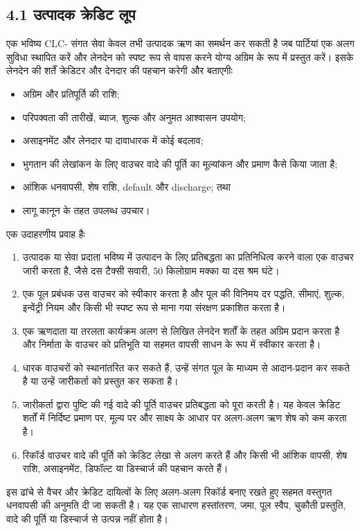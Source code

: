 \documentclass[11pt]{article}
\begin{document}
\subsection*{4.1 उत्पादक क्रेडिट लूप}

एक भविष्य CLC- संगत सेवा केवल तभी उत्पादक ऋण का समर्थन कर सकती है जब पार्टियां एक अलग सुविधा स्थापित करें और लेनदेन को स्पष्ट रूप से वापस करने योग्य अग्रिम के रूप में प्रस्तुत करें। इसके लेनदेन की शर्तें क्रेडिटर और देनदार की पहचान करेगी और बताएगीः

\begin{itemize}[leftmargin=*]
\item अग्रिम और प्रतिपूर्ति की राशि;
\item परिपक्वता की तारीखें, ब्याज, शुल्क और अनुमत आश्वासन उपयोग;
\item असाइनमेंट और लेनदार या दावाधारक में कोई बदलाव;
\item भुगतान की लेखांकन के लिए वाउचर वादे की पूर्ति का मूल्यांकन और प्रमाण कैसे किया जाता है;
\item आंशिक धनवापसी, शेष राशि, default और discharge; तथा
\item लागू कानून के तहत उपलब्ध उपचार।
\end{itemize}
एक उदाहरणीय प्रवाह हैः

\begin{enumerate}[leftmargin=*]
\item उत्पादक या सेवा प्रदाता भविष्य में उत्पादन के लिए प्रतिबद्धता का प्रतिनिधित्व करने वाला एक वाउचर जारी करता है, जैसे दस टैक्सी सवारी, 50 किलोग्राम मक्का या दस श्रम घंटे।
\item एक पूल प्रबंधक उस वाउचर को स्वीकार करता है और पूल की विनिमय दर पद्धति, सीमाएं, शुल्क, इन्वेंट्री नियम और किसी भी स्पष्ट रूप से माना गया संरक्षण प्रकाशित करता है।
\item एक ऋणदाता या तरलता कार्यक्रम अलग से लिखित लेनदेन शर्तों के तहत अग्रिम प्रदान करता है और निर्माता के वाउचर को प्रतिभूति या सहमत वापसी साधन के रूप में स्वीकार करता है।
\item धारक वाउचरों को स्थानांतरित कर सकते हैं, उन्हें संगत पूल के माध्यम से आदान-प्रदान कर सकते है या उन्हें जारीकर्ता को प्रस्तुत कर सकता है।
\item जारीकर्ता द्वारा पुष्टि की गई वादे की पूर्ति वाउचर प्रतिबद्धता को पूरा करती है। यह केवल क्रेडिट शर्तों में निर्दिष्ट प्रमाण पर, मूल्य पर और साक्ष्य के आधार पर अलग-अलग ऋण शेष को कम करता है।
\item रिकॉर्ड वाउचर वादे की पूर्ति को क्रेडिट लेखा से अलग करते हैं और किसी भी आंशिक वापसी, शेष राशि, असाइनमेंट, डिफॉल्ट या डिस्चार्ज की पहचान करते हैं।
\end{enumerate}
इस ढांचे से वैचर और क्रेडिट दायित्वों के लिए अलग-अलग रिकॉर्ड बनाए रखते हुए सहमत वस्तुगत धनवापसी की अनुमति दी जा सकती है। यह एक साधारण हस्तांतरण, जमा, पूल स्वैप, चुकौती प्रस्तुति, वादे की पूर्ति या डिस्चार्ज से उत्पन्न नहीं होता है।
\end{document}
